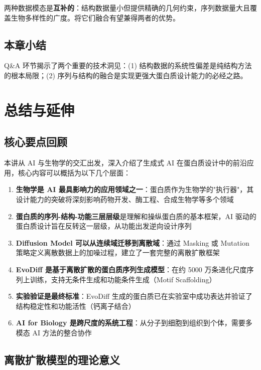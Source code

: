 \documentclass[a4paper]{article}
\begin{document}
两种数据模态是\textbf{互补的}：结构数据量小但提供精确的几何约束，序列数据量大且覆盖生物多样性的广度。将它们融合有望兼得两者的优势。

\subsection{本章小结}

Q\&A 环节揭示了两个重要的技术洞见：(1) 结构数据的系统性偏差是纯结构方法的根本局限；(2) 序列与结构的融合是实现更强大蛋白质设计能力的必经之路。


\section{总结与延伸}

\subsection{核心要点回顾}

本讲从 AI 与生物学的交汇出发，深入介绍了生成式 AI 在蛋白质设计中的前沿应用，核心内容可以概括为以下几个层面：

\begin{enumerate}
    \item \textbf{生物学是 AI 最具影响力的应用领域之一}：蛋白质作为生物学的"执行器"，其设计能力的突破将深刻影响药物开发、酶工程、合成生物学等多个领域

    \item \textbf{蛋白质的序列-结构-功能三层层级}是理解和操纵蛋白质的基本框架，AI 驱动的蛋白质设计旨在反转这一层级，从功能出发逆向设计序列

    \item \textbf{Diffusion Model 可以从连续域迁移到离散域}：通过 Masking 或 Mutation 策略定义离散数据上的加噪过程，建立了一套完整的离散扩散框架

    \item \textbf{EvoDiff 是基于离散扩散的蛋白质序列生成模型}：在约 5000 万条进化尺度序列上训练，支持无条件生成和功能条件生成（Motif Scaffolding）

    \item \textbf{实验验证是最终标准}：EvoDiff 生成的蛋白质已在实验室中成功表达并验证了结构稳定性和功能活性（钙离子结合）

    \item \textbf{AI for Biology 是跨尺度的系统工程}：从分子到细胞到组织到个体，需要多模态 AI 方法的整合协作
\end{enumerate}

\subsection{离散扩散模型的理论意义}
\end{document}
